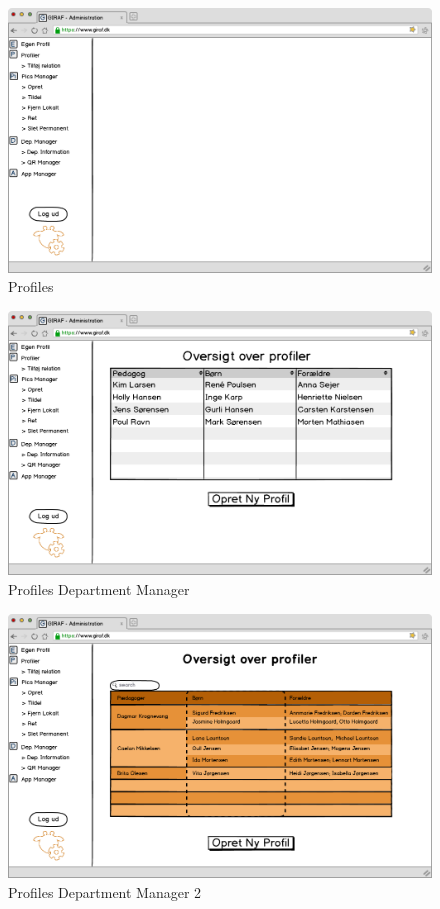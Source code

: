 \begin{figure}[!h]
\centering
\includegraphics[width=1\textwidth]{images/mockup/profiler.png}
\caption{Profiles}
\label{fig:profiles}
\end{figure}

\newpage

\begin{figure}[!h]
\centering
\includegraphics[width=1\textwidth]{images/mockup/profilerDeptManager.png}
\caption{Profiles Department Manager}
\label{fig:profiles_dept_manager}
\end{figure}

\begin{figure}[!h]
\centering
\includegraphics[width=1\textwidth]{images/mockup/profilerDeptManager1.png}
\caption{Profiles Department Manager 2}
\label{fig:profiles_dept_manager2}
\end{figure}

